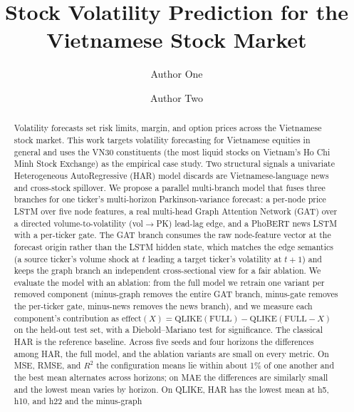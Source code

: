 \documentclass[runningheads]{llncs}
\begin{document}
%
\title{Stock Volatility Prediction for the Vietnamese Stock Market}
%
%
\author{Author One \and Author Two}
%
%
\maketitle
%
\begin{abstract}
Volatility forecasts set risk limits, margin, and option prices across the Vietnamese stock market. This
work targets volatility forecasting for Vietnamese equities in general and uses the VN30 constituents
(the most liquid stocks on Vietnam's Ho Chi Minh Stock Exchange) as the empirical case study. Two
structural signals a univariate Heterogeneous AutoRegressive (HAR) model discards are Vietnamese-language
news and cross-stock spillover. We propose a parallel multi-branch model that fuses three branches for one
ticker's multi-horizon Parkinson-variance forecast: a per-node price LSTM over five node features, a real
multi-head Graph Attention Network (GAT) over a directed volume-to-volatility (vol$\to$PK) lead-lag edge,
and a PhoBERT news LSTM with a per-ticker gate. The GAT branch consumes the raw node-feature vector at the
forecast origin rather than the LSTM hidden state, which matches the edge semantics (a source ticker's
volume shock at $t$ leading a target ticker's volatility at $t{+}1$) and keeps the graph branch an
independent cross-sectional view for a fair ablation. We evaluate the model with an ablation: from the full
model we retrain one variant per removed component (minus-graph removes the entire GAT branch, minus-gate
removes the per-ticker gate, minus-news removes the news branch), and we measure each component's
contribution as $\text{effect}(X)=\text{QLIKE}(\text{FULL})-\text{QLIKE}(\text{FULL}{-}X)$ on the held-out
test set, with a Diebold--Mariano test for significance. The classical HAR is the reference baseline.
Across five seeds and four horizons the differences among HAR, the full model, and the ablation variants
are small on every metric. On MSE, RMSE, and $R^2$ the configuration means lie within about 1\% of one
another and the best mean alternates across horizons; on MAE the differences are similarly small and the
lowest mean varies by horizon. On QLIKE, HAR has the lowest mean at h5, h10, and h22 and the minus-graph

\end{abstract}
\end{document}
